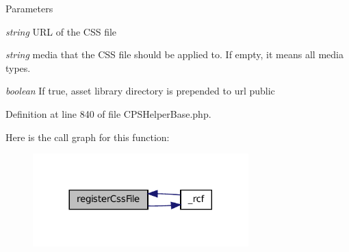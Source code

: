 \begin{DoxyParams}{Parameters}
\item[{\em string}]URL of the CSS file \item[{\em string}]media that the CSS file should be applied to. If empty, it means all media types. \item[{\em boolean}]If true, asset library directory is prepended to url  public \end{DoxyParams}


Definition at line 840 of file CPSHelperBase.php.








Here is the call graph for this function:\nopagebreak
\begin{figure}[H]
\begin{center}
\leavevmode
\includegraphics[width=236pt]{classCPSHelperBase_af06aa8413e78124ffe297435efed445a_cgraph}
\end{center}
\end{figure}




